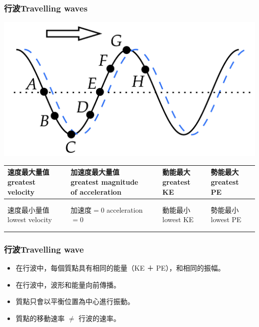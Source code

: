 \documentclass[beamer=true]{standalone}
\begin{document}
\begin{frame}
    \frametitle{行波Travelling waves}
    \par{\par\centering\includegraphics[width=.5\textwidth]{./img/ch1_2024-05-09-15-04-33.png}\par}
    \begin{table}[]
        \begin{tabular}{l|l|l|l}
            \makecell{速度最大量值 \\greatest velocity} & \makecell{加速度最大量值\\greatest magnitude\\of acceleration}   & \makecell{動能最大\\greatest KE} & \makecell{勢能最大\\greatest PE} \\
            \hline
             &  &  &         \\
             &  &  &         \\
            \hline
            \makecell{速度最小量值 \\lowest velocity} & \makecell{加速度$=0$\\acceleration $=0$} & \makecell{動能最小\\lowest KE} & \makecell{勢能最小\\lowest PE} \\
            \hline
             &  &  &         \\
             &  &  &         \\
        \end{tabular}
    \end{table}
\end{frame}

\begin{frame}
    \frametitle{行波Travelling wave}
    \begin{itemize}
        \item 在行波中，每個質點具有相同的能量（KE ＋ PE），和相同的振幅。
        \item 在行波中，波形和能量向前傳播。
        \item 質點只會以平衡位置為中心進行振動。
        \item 質點的移動速率 $\neq$ 行波的速率。
    \end{itemize}


\end{frame}
\end{document}
